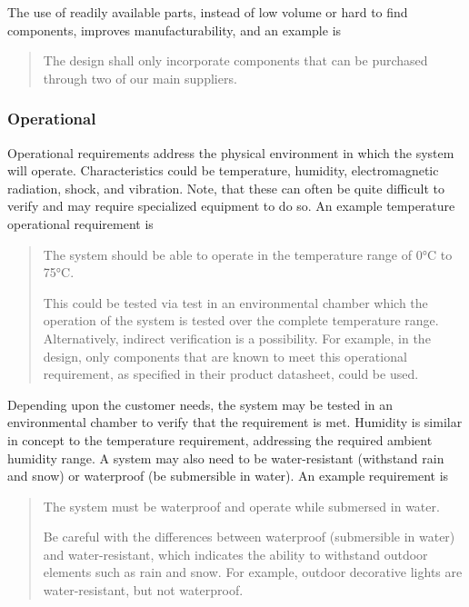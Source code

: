 The use of readily available parts, instead of low volume or hard to
find components, improves manufacturability, and an example is

\begin{quote}
The design shall only incorporate components that can be purchased
through two of our main suppliers.
\end{quote}

\subsubsection*{Operational}\label{operational}

Operational requirements address the physical environment in which the
system will operate. Characteristics could be temperature, humidity,
electromagnetic radiation, shock, and vibration. Note, that these can
often be quite difficult to verify and may require specialized equipment
to do so. An example temperature operational requirement is

\begin{quote}
The system should be able to operate in the temperature range of 0°C to
75°C.

This could be tested via test in an environmental chamber which the
operation of the system is tested over the complete temperature range.
Alternatively, indirect verification is a possibility. For example, in
the design, only components that are known to meet this operational
requirement, as specified in their product datasheet, could be used.
\end{quote}

Depending upon the customer needs, the system may be tested in an
environmental chamber to verify that the requirement is met. Humidity is
similar in concept to the temperature requirement, addressing the
required ambient humidity range. A system may also need to be
water-resistant (withstand rain and snow) or waterproof (be submersible
in water). An example requirement is

\begin{quote}
The system must be waterproof and operate while submersed in water.

Be careful with the differences between waterproof (submersible in
water) and water-resistant, which indicates the ability to withstand
outdoor elements such as rain and snow. For example, outdoor decorative
lights are water-resistant, but not waterproof.
\end{quote}

